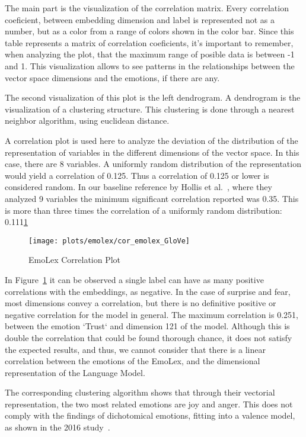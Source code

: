 The main part is the visualization of the correlation matrix. Every correlation coeficient, between embedding dimension and label is represented not as a number, but as a color from a range of colors shown in the color bar. Since this table represents a matrix of correlation coeficients, it's important to remember, when analyzing the plot, that the maximum range of posible data is between -1 and 1. This visualization allows to see patterns in the relationships between the vector space dimensions and the emotions, if there are any.

The second visualization of this plot is the left dendrogram. A dendrogram is the visualization of a clustering structure. This clustering is done through a nearest neighbor algorithm, using euclidean distance.

A correlation plot is used here to analyze the deviation of the distribution of the representation of variables in the different dimensions of the vector space. In this case, there are 8 variables. A uniformly random distribution of the representation would yield a correlation of 0.125. Thus a correlation of  0.125 or lower is considered random. In our baseline reference by Hollis et al.~\cite{hollis2016principals}, where they analyzed 9 variables the minimum significant correlation reported was 0.35. This is more than three times the correlation of a uniformly random distribution: 0.111\underline{1}

\begin{figure}[H]
  \texttt{[image: plots/emolex/cor\_emolex\_GloVe]}
  \centering
  \caption{EmoLex Correlation Plot}\label{fig:cor_emolex_GloVe}
\end{figure}

In Figure~\ref{fig:cor_emolex_GloVe} it can be observed a single label can have as many positive correlations with the embeddings, as negative. In the case of surprise and fear, most dimensions convey a correlation, but there is no definitive positive or negative correlation for the model in general.
The maximum correlation is 0.251, between the emotion `Trust` and dimension 121 of the model. Although this is double the correlation that could be found thorough chance, it does not satisfy the expected results, and thus, we cannot consider that there is a linear correlation between the emotions of the EmoLex, and the dimensional representation of the Language Model.

The corresponding clustering algorithm shows that through their vectorial representation, the two most related emotions are joy and anger. This does not comply with the findings of dichotomical emotions, fitting into a valence model, as shown in the 2016 study~\cite{barradas2016thesis}.

